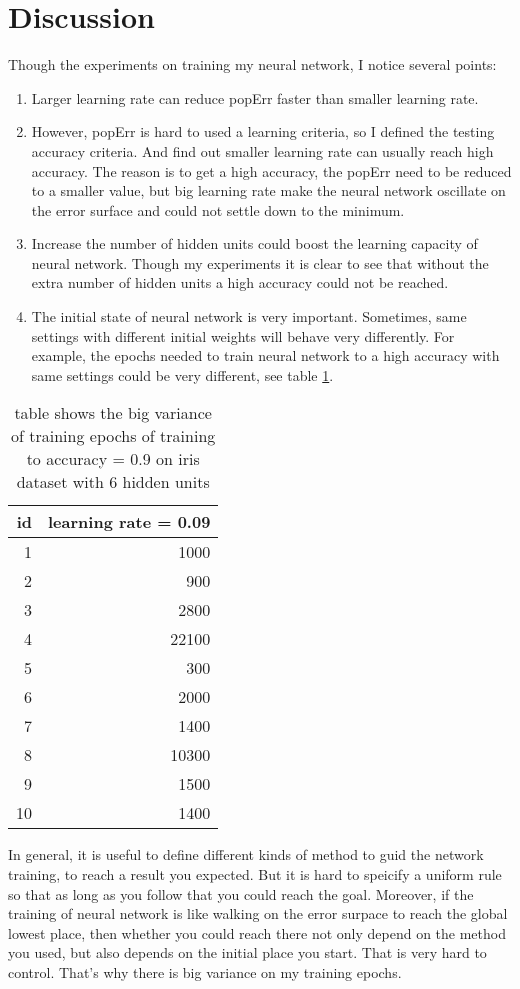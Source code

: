 \documentclass[11pt]{article}
\begin{document}
\section{Discussion}
\label{sec-4}
Though the experiments on training my neural network, I notice several points:
\begin{enumerate}
\item Larger learning rate can reduce popErr faster than smaller learning rate.
\item However, popErr is hard to used a learning criteria, so I defined the testing accuracy criteria. And find out smaller learning rate can usually reach high accuracy. The reason is to get a high accuracy, the popErr need to be reduced to a smaller value, but big learning rate make the neural network oscillate on the error surface and could not settle down to the minimum.
\item Increase the number of hidden units could boost the learning capacity of neural network. Though my experiments it is clear to see that without the extra number of hidden units a high accuracy could not be reached.
\item The initial state of neural network is very important. Sometimes, same settings with different initial weights will behave very differently. For example, the epochs needed to train neural network to a high accuracy with same settings could be very different, see table \ref{table-epochs-variance-on-iris}.
\end{enumerate}
\begin{table}[htb]
\caption{table shows the big variance of training epochs of training to accuracy = 0.9 on iris dataset with 6 hidden units \label{table-epochs-variance-on-iris}}
\centering
\begin{tabular}{rr}
id & learning rate = 0.09\\
\hline
1 & 1000\\
2 & 900\\
3 & 2800\\
4 & 22100\\
5 & 300\\
6 & 2000\\
7 & 1400\\
8 & 10300\\
9 & 1500\\
10 & 1400\\
\hline
\end{tabular}
\end{table}

In general, it is useful to define different kinds of method to guid the network training, to reach a result you expected. But it is hard to speicify a uniform rule so that as long as you follow that you could reach the goal. Moreover, if the training of neural network is like walking on the error surpace to reach the global lowest place, then whether you could reach there not only depend on the method you used, but also depends on the initial place you start. That is very hard to control. That's why there is big variance on my training epochs.
\end{document}
